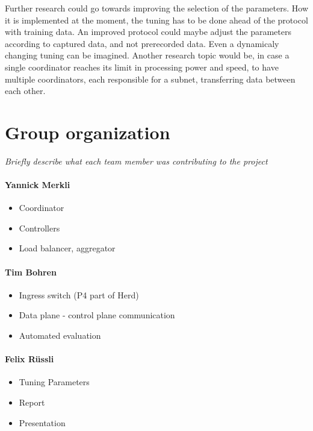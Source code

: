 \documentclass[11pt,oneside,a4paper]{article}
\newcommand{\hint}[1]{{\color{blue} \em #1}}
\begin{document}
Further research could go towards improving the selection of the parameters. How it is implemented at the moment, the tuning has to be done ahead of the protocol with training data. An improved protocol could maybe adjust the parameters according to captured data, and not prerecorded data. Even a dynamicaly changing tuning can be imagined. Another research topic would be, in case a single coordinator reaches its limit in processing power and speed, to have multiple coordinators, each responsible for a subnet, transferring data between each other.

\label{lastpage} %
\clearpage
{}



\clearpage
\appendix
{}

\section{Group organization}
\hint{Briefly describe what each team member was contributing to the project}%

\paragraph{Yannick Merkli}
\begin{itemize}
	\item Coordinator
	\item Controllers
	\item Load balancer, aggregator
\end{itemize}


\paragraph{Tim Bohren}
\begin{itemize}
	\item Ingress switch (P4 part of Herd)
	\item Data plane - control plane communication
	\item Automated evaluation
\end{itemize}

\paragraph{Felix Rüssli}
\begin{itemize}
	\item Tuning Parameters
	\item Report
	\item Presentation
\end{itemize}
\end{document}
